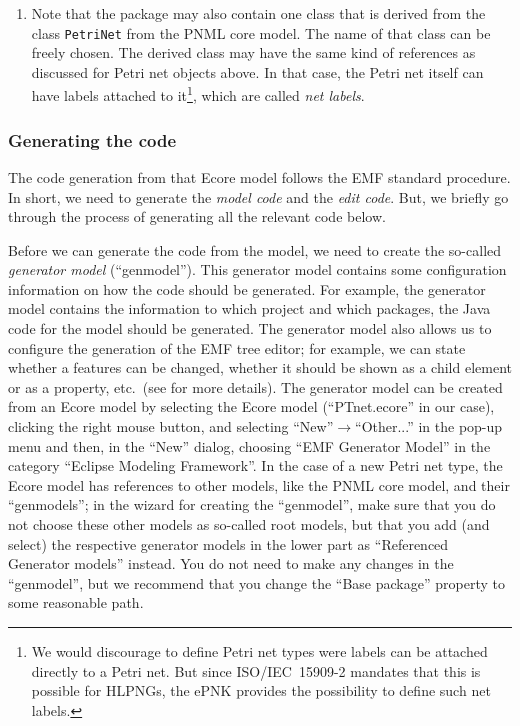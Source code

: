 \begin{enumerate}
   \item Note that the package may also contain one class that is derived from
         the class {\tt PetriNet}%
         from the PNML core model. The name of that
         class can be freely chosen. The derived class may have 
         the same kind of references as discussed for Petri net objects
         above. In that case, the Petri net itself can have labels attached
         to it\footnote
           {We would discourage to define Petri net types were labels can be
            attached directly to a Petri net. But since ISO/IEC~15909-2 mandates
            that this is possible for HLPNGs, the ePNK provides the possibility
            to define such net labels.},
         which are called \emph{net labels}.%
\end{enumerate}

\subsubsection{Generating the code}
\label{subsubsec:type-codegeneration}
The code generation from that Ecore model follows the EMF standard
procedure. In short, we need to generate the \emph{model code} and the
\emph{edit code}. But, we briefly go through the process of generating all
the relevant code below.

Before we can generate the code from the model, we need to
create the so-called \emph{generator model}%
(``genmodel''). This generator
model contains some configuration information on how the code should be
generated.
For example, the generator model contains the information to which project and
which packages, the Java code for the model should be generated. The generator
model also allows us to configure the generation of the EMF tree editor; for
example, we can state whether a features can be changed, whether it should be shown as a child
element or as a property, etc.\ (see \cite{BSM06} for more details).  The
generator model can be created from an Ecore model by selecting the Ecore
model (``PTnet.ecore'' in our case), clicking the right mouse button, and selecting
``New''$\rightarrow$``Other...'' in the pop-up menu and then, in the ``New''
dialog, choosing ``EMF Generator Model'' in the category ``Eclipse Modeling
Framework''. In the case of a new Petri net type, the Ecore model has
references to other models, like the PNML core model, and their ``genmodels'';
in the wizard for creating the ``genmodel'', make sure that you do not choose
these other models as so-called root models, but that you add (and select) the
respective generator models in the lower part as ``Referenced Generator models'' instead.
You do not need to make any changes in the ``genmodel'', but we
recommend that you change the ``Base package'' property to some reasonable
path.

